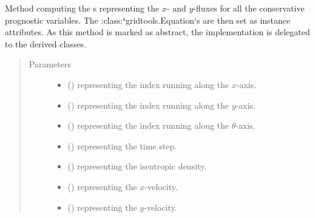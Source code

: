\documentclass[letterpaper,10pt,english]{sphinxmanual}
\begin{document}
\begin{fulllineitems}
\begin{fulllineitems}
\label{\detokenize{api:dycore.flux_isentropic.FluxIsentropic._compute_fluxes}}
Method computing the s representing the \(x\)- and \(y\)-fluxes for all
the conservative prognostic variables. The :class:{\color{red}\bfseries{}{}`}gridtools.Equation{}`s are then set as instance attributes.
As this method is marked as abstract, the implementation is delegated to the derived classes.
\begin{quote}\begin{description}
\item[{Parameters}] \leavevmode\begin{itemize}
\item {} 
 () \textendash{}  representing the index running along the \(x\)-axis.

\item {} 
 () \textendash{}  representing the index running along the \(y\)-axis.

\item {} 
 () \textendash{}  representing the index running along the \(\theta\)-axis.

\item {} 
 () \textendash{}  representing the time step.

\item {} 
 () \textendash{}  representing the isentropic density.

\item {} 
 () \textendash{}  representing the \(x\)-velocity.

\item {} 
 () \textendash{}  representing the \(y\)-velocity.


\end{itemize}
\end{description}
\end{quote}
\end{fulllineitems}
\end{fulllineitems}
\end{document}
